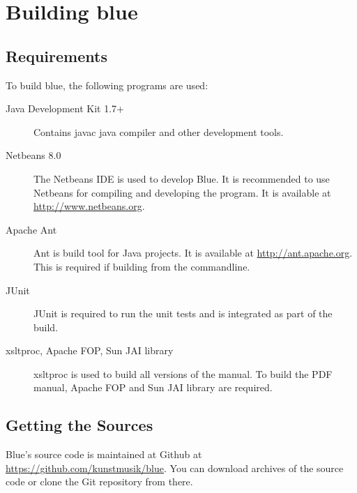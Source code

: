 \section{Building blue}\label{buildingBlue}

\subsection{Requirements}

To build blue, the following programs are used:

\begin{description}
\item[Java Development Kit 1.7+]
Contains javac java compiler and other development tools.
\item[Netbeans 8.0]
The Netbeans IDE is used to develop Blue. It is recommended to use
Netbeans for compiling and developing the program. It is available at
\url{http://www.netbeans.org}.
\item[Apache Ant]
Ant is build tool for Java projects. It is available at
\url{http://ant.apache.org}. This is required if building from the
commandline.
\item[JUnit]
JUnit is required to run the unit tests and is integrated as part of the
build.
\item[xsltproc, Apache FOP, Sun JAI library]
xsltproc is used to build all versions of the manual. To build the PDF
manual, Apache FOP and Sun JAI library are required.
\end{description}

\subsection{Getting the Sources}

Blue's source code is maintained at Github at
\url{https://github.com/kunstmusik/blue}. You can download archives of
the source code or clone the Git repository from there.
